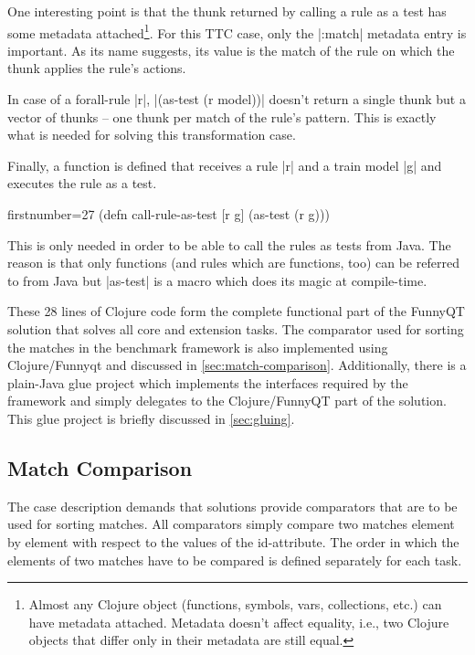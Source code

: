 \documentclass[submission]{eptcs}
\newcommand{\code}{\clojureinline}
\begin{document}
One interesting point is that the thunk returned by calling a rule as a test
has some metadata attached\footnote{Almost any Clojure object (functions,
  symbols, vars, collections, etc.) can have metadata attached.  Metadata
  doesn't affect equality, i.e., two Clojure objects that differ only in their
  metadata are still equal.}.  For this TTC case, only the \code|:match|
metadata entry is important.  As its name suggests, its value is the match of
the rule on which the thunk applies the rule's actions.

In case of a forall-rule \code|r|, \code|(as-test (r model))| doesn't return a
single thunk but a vector of thunks -- one thunk per match of the rule's
pattern.  This is exactly what is needed for solving this transformation case.

Finally, a function is defined that receives a rule \code|r| and a train model
\code|g| and executes the rule as a test.

\begin{clojurecode*}{firstnumber=27}
(defn call-rule-as-test [r g]
  (as-test (r g)))
\end{clojurecode*}

This is only needed in order to be able to call the rules as tests from Java.
The reason is that only functions (and rules which are functions, too) can be
referred to from Java but \code|as-test| is a macro which does its magic at
compile-time.

These 28 lines of Clojure code form the complete functional part of the FunnyQT
solution that solves all core and extension tasks.  The comparator used for
sorting the matches in the benchmark framework is also implemented using
Clojure/Funnyqt and discussed in \vref{sec:match-comparison}.  Additionally,
there is a plain-Java glue project which implements the interfaces required by
the framework and simply delegates to the Clojure/FunnyQT part of the solution.
This glue project is briefly discussed in \vref{sec:gluing}.


\subsection{Match Comparison}
\label{sec:match-comparison}

The case description demands that solutions provide comparators that are to be
used for sorting matches.  All comparators simply compare two matches element
by element with respect to the values of the \textsf{id}-attribute.  The order
in which the elements of two matches have to be compared is defined separately
for each task.
\end{document}
